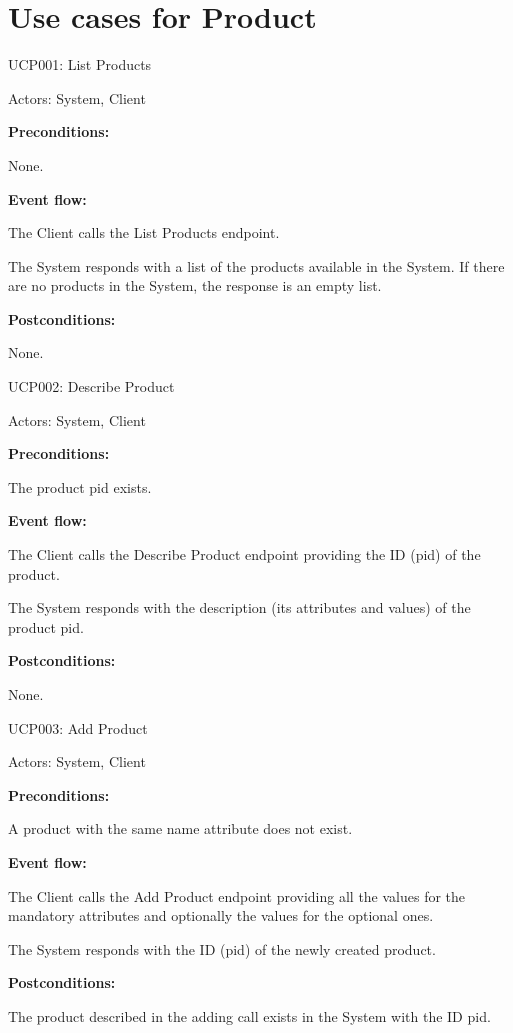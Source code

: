 \section{Use cases for Product}

\begin{ucbox}{UCP001: List Products}
\label{UCP001}

Actors: System, Client

\textbf{Preconditions:}

\ucitem None.

\textbf{Event flow:}

\ucitem The Client calls the List Products endpoint.

\ucitem The System responds with a list of the products available in the System. If there are no products in the System, the response is an empty list.

\textbf{Postconditions:}

\ucitem None.

\end{ucbox}

\begin{ucbox}{UCP002: Describe Product}
\label{UCP002}

Actors: System, Client

\textbf{Preconditions:} 

\ucitem The product pid exists.

\textbf{Event flow:}

\ucitem The Client calls the Describe Product endpoint providing the ID (pid) of the product.

\ucitem The System responds with the description (its attributes and values) of the product pid.

\textbf{Postconditions:}

\ucitem None.

\end{ucbox}

\begin{ucbox}{UCP003: Add Product}
\label{UCP003}

Actors: System, Client

\textbf{Preconditions:} 

\ucitem A product with the same name attribute does not exist.

\textbf{Event flow:}

\ucitem The Client calls the Add Product endpoint providing all the values for the mandatory attributes and optionally the values for the optional ones.

\ucitem The System responds with the ID (pid) of the newly created product.

\textbf{Postconditions:}

\ucitem The product described in the adding call exists in the System with the ID pid.

\end{ucbox}

